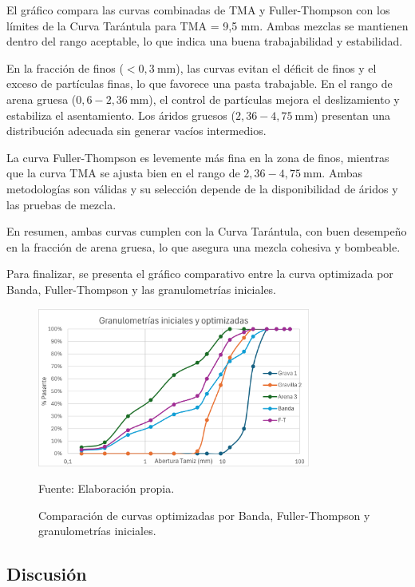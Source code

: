El gráfico compara las curvas combinadas de TMA y Fuller-Thompson con los límites de la Curva Tarántula para TMA = 9,5 mm. Ambas mezclas se mantienen dentro del rango aceptable, lo que indica una buena trabajabilidad y estabilidad.

En la fracción de finos (\(<0,3~\text{mm}\)), las curvas evitan el déficit de finos y el exceso de partículas finas, lo que favorece una pasta trabajable. En el rango de arena gruesa (\(0,6-2,36~\text{mm}\)), el control de partículas mejora el deslizamiento y estabiliza el asentamiento. Los áridos gruesos (\(2,36-4,75~\text{mm}\)) presentan una distribución adecuada sin generar vacíos intermedios.

La curva Fuller-Thompson es levemente más fina en la zona de finos, mientras que la curva TMA se ajusta bien en el rango de \(2,36-4,75~\text{mm}\). Ambas metodologías son válidas y su selección depende de la disponibilidad de áridos y las pruebas de mezcla.

En resumen, ambas curvas cumplen con la Curva Tarántula, con buen desempeño en la fracción de arena gruesa, lo que asegura una mezcla cohesiva y bombeable.

Para finalizar, se presenta el gráfico comparativo entre la curva optimizada por Banda, Fuller-Thompson y las granulometrías iniciales.

\begin{figure}[H]
    \centering
    \includegraphics[width=0.8\textwidth]{GRAFICOS/granu_final.png}
    \caption{Comparación de curvas optimizadas por Banda, Fuller-Thompson y granulometrías iniciales.}
    \label{fig:curvas_comparativas}
    Fuente: Elaboración propia.
\end{figure}

\subsection{Discusión}

